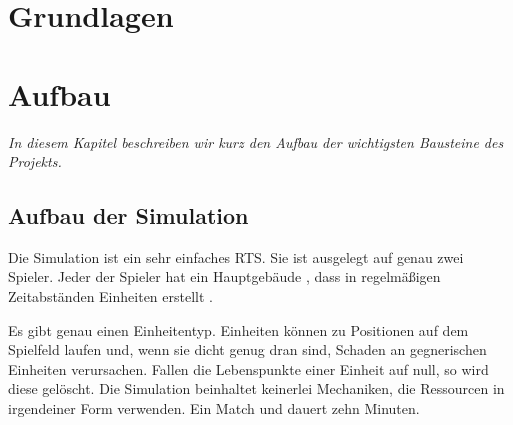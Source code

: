 \documentclass[
	12pt,
	a4paper,
	BCOR10mm,
	DIV14,
	headsepline,
	usegeometry,
]{scrreprt}
\begin{document}
\chapter{Grundlagen}
\label{basics}



\chapter{Aufbau}
\label{Aufbau}

\textit{%
In diesem Kapitel beschreiben wir kurz den Aufbau der wichtigsten Bausteine des Projekts.
}

\bigskip



\section{Aufbau der Simulation}
Die Simulation ist ein sehr einfaches RTS. 
Sie ist ausgelegt auf genau zwei Spieler. 
Jeder der Spieler hat ein Hauptgebäude , dass in regelmäßigen Zeitabständen Einheiten  erstellt . 

Es gibt genau einen Einheitentyp. 
 Einheiten können zu Positionen auf dem Spielfeld laufen und, wenn sie dicht genug dran sind, Schaden an gegnerischen Einheiten verursachen. 
Fallen die Lebenspunkte einer Einheit auf null, so wird diese gelöscht.
Die Simulation beinhaltet keinerlei Mechaniken, die Ressourcen in irgendeiner Form verwenden.
Ein Match  und dauert zehn Minuten.
\end{document}

